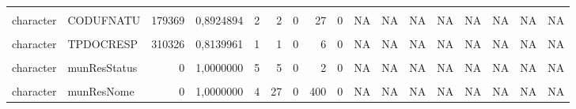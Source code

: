 \begin{table}[!h]
\begin{tabular}[t]{llrrrrrrrrrrrrrrl}
\cellcolor{gray!10}{character} & \cellcolor{gray!10}{STCESPARTO} & \cellcolor{gray!10}{145072} & \cellcolor{gray!10}{0,9130464} & \cellcolor{gray!10}{1} & \cellcolor{gray!10}{1} & \cellcolor{gray!10}{0} & \cellcolor{gray!10}{4} & \cellcolor{gray!10}{0} & \cellcolor{gray!10}{NA} & \cellcolor{gray!10}{NA} & \cellcolor{gray!10}{NA} & \cellcolor{gray!10}{NA} & \cellcolor{gray!10}{NA} & \cellcolor{gray!10}{NA} & \cellcolor{gray!10}{NA} & \cellcolor{gray!10}{NA}\\
\addlinespace
character & CODUFNATU & 179369 & 0,8924894 & 2 & 2 & 0 & 27 & 0 & NA & NA & NA & NA & NA & NA & NA & NA\\
\cellcolor{gray!10}{character} & \cellcolor{gray!10}{TPFUNCRESP} & \cellcolor{gray!10}{411904} & \cellcolor{gray!10}{0,7531120} & \cellcolor{gray!10}{1} & \cellcolor{gray!10}{1} & \cellcolor{gray!10}{0} & \cellcolor{gray!10}{5} & \cellcolor{gray!10}{0} & \cellcolor{gray!10}{NA} & \cellcolor{gray!10}{NA} & \cellcolor{gray!10}{NA} & \cellcolor{gray!10}{NA} & \cellcolor{gray!10}{NA} & \cellcolor{gray!10}{NA} & \cellcolor{gray!10}{NA} & \cellcolor{gray!10}{NA}\\
character & TPDOCRESP & 310326 & 0,8139961 & 1 & 1 & 0 & 6 & 0 & NA & NA & NA & NA & NA & NA & NA & NA\\
\cellcolor{gray!10}{character} & \cellcolor{gray!10}{DTDECLARAC} & \cellcolor{gray!10}{317893} & \cellcolor{gray!10}{0,8094605} & \cellcolor{gray!10}{10} & \cellcolor{gray!10}{10} & \cellcolor{gray!10}{0} & \cellcolor{gray!10}{3296} & \cellcolor{gray!10}{0} & \cellcolor{gray!10}{NA} & \cellcolor{gray!10}{NA} & \cellcolor{gray!10}{NA} & \cellcolor{gray!10}{NA} & \cellcolor{gray!10}{NA} & \cellcolor{gray!10}{NA} & \cellcolor{gray!10}{NA} & \cellcolor{gray!10}{NA}\\
character & munResStatus & 0 & 1,0000000 & 5 & 5 & 0 & 2 & 0 & NA & NA & NA & NA & NA & NA & NA & NA\\
\addlinespace
\cellcolor{gray!10}{character} & \cellcolor{gray!10}{munResTipo} & \cellcolor{gray!10}{0} & \cellcolor{gray!10}{1,0000000} & \cellcolor{gray!10}{5} & \cellcolor{gray!10}{5} & \cellcolor{gray!10}{0} & \cellcolor{gray!10}{2} & \cellcolor{gray!10}{0} & \cellcolor{gray!10}{NA} & \cellcolor{gray!10}{NA} & \cellcolor{gray!10}{NA} & \cellcolor{gray!10}{NA} & \cellcolor{gray!10}{NA} & \cellcolor{gray!10}{NA} & \cellcolor{gray!10}{NA} & \cellcolor{gray!10}{NA}\\
character & munResNome & 0 & 1,0000000 & 4 & 27 & 0 & 400 & 0 & NA & NA & NA & NA & NA & NA & NA & NA\\

\end{tabular}
\end{table}
